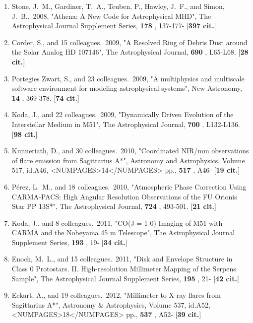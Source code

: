 \documentclass[11pt,letterpaper]{article}
\newcommand{\amp}{\&}
\begin{document}
\begin{enumerate}[resume,label=\textbf{\arabic*}.]
\item  
Stone, J.~M., Gardiner, T.~A., Teuben, P., Hawley, J.~F., and Simon, 
J.~B..\  2008,  "Athena: A New Code for Astrophysical MHD", The 
Astrophysical Journal Supplement Series,  {\bf 178} , 137-177- [{\bf 397 
cit.}] 

\item  
Corder, S., and 15 colleagues.\  2009,  "A Resolved Ring of Debris Dust 
around the Solar Analog HD 107146", The Astrophysical Journal,  {\bf 690} , 
L65-L68.  [{\bf 28 cit.}] 

\item  
Portegies Zwart, S., and 23 colleagues.\  2009,  "A multiphysics and 
multiscale software environment for modeling astrophysical systems", New 
Astronomy,  {\bf 14} , 369-378.  [{\bf 74 cit.}] 

\item  
Koda, J., and 22 colleagues.\  2009,  "Dynamically Driven Evolution of the 
Interstellar Medium in M51", The Astrophysical Journal,  {\bf 700} , 
L132-L136.  [{\bf 98 cit.}] 

\item  
Kunneriath, D., and 30 colleagues.\  2010,  "Coordinated NIR/mm 
observations of flare emission from Sagittarius A*", Astronomy and 
Astrophysics, Volume 517, id.A46, <NUMPAGES>14</NUMPAGES> pp.,  {\bf 517} , A46- [{\bf 19 cit.}] 

\item  
P{\'e}rez, L.~M., and 18 colleagues.\  2010,  "Atmospheric Phase Correction 
Using CARMA-PACS: High Angular Resolution Observations of the FU Orionis 
Star PP 13S*", The Astrophysical Journal,  {\bf 724} , 493-501.  [{\bf 21 
cit.}] 

\item  
Koda, J., and 8 colleagues.\  2011,  "CO(J = 1-0) Imaging of M51 with CARMA 
and the Nobeyama 45 m Telescope", The Astrophysical Journal Supplement 
Series,  {\bf 193} , 19- [{\bf 34 cit.}] 

\item  
Enoch, M.~L., and 15 colleagues.\  2011,  "Disk and Envelope Structure in 
Class 0 Protostars. II. High-resolution Millimeter Mapping of the Serpens 
Sample", The Astrophysical Journal Supplement Series,  {\bf 195} , 21- 
[{\bf 42 cit.}] 

\item  
Eckart, A., and 19 colleagues.\  2012,  "Millimeter to X-ray flares from 
Sagittarius A*", Astronomy {\amp} Astrophysics, Volume 537, id.A52, <NUMPAGES>18</NUMPAGES> 
pp.,  {\bf 537} , A52- [{\bf 39 cit.}] 


\end{enumerate}
\end{document}
